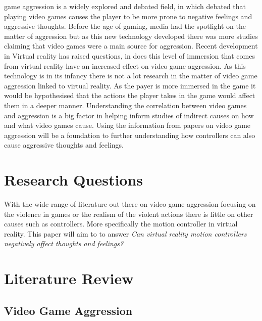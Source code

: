 \documentclass[journal]{IEEEtran}
\begin{document}
 game aggression is a widely explored and debated field, in which debated that playing video games causes the player to be more prone to negative feelings and aggressive thoughts. Before the age of gaming, media had the spotlight on the matter of aggression but as this new technology developed there was more studies claiming that video games were a main source for aggression. Recent development in Virtual reality has raised questions, in does this level of immersion that comes from virtual reality have an increased effect on video game aggression. As this technology is in its infancy there is not a lot research in the matter of video game aggression linked to virtual reality. As the payer is more immersed in the game it would be hypothesised that the actions the player takes in the game would affect them in a deeper manner.
Understanding the correlation between video games and aggression is a big factor in helping inform studies of indirect causes on how and what video games cause. Using the information from papers on video game aggression will be a foundation to further understanding how controllers can also cause aggressive thoughts and feelings.




\section{Research Questions}

With the wide range of literature out there on video game aggression focusing on the violence in games or the realism of the violent actions there is little on other causes such as controllers. More specifically the motion controller in virtual reality. This paper will aim to to answer \textit{Can virtual reality motion controllers negatively affect thoughts and feelings?}


\section{Literature Review}

    \subsection{Video Game Aggression}
   
\end{document}
